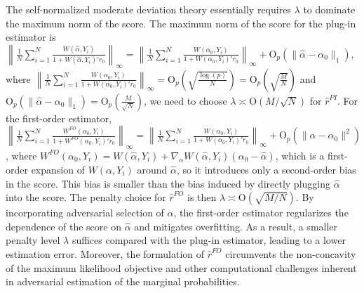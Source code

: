 \documentclass[11pt]{article}
\begin{document}
The self-normalized moderate deviation theory essentially requires $\lambda$ to dominate the maximum norm of the score. The maximum norm of the score for the plug-in estimator is $\left\|\frac{1}{N}\sum_{i=1}^N\frac{W(\hat{\alpha},Y_i)}{1+W(\hat\alpha,Y_i)'r_0}\right\|_\infty=\left\|\frac{1}{N}\sum_{i=1}^N\frac{W(\alpha_0,Y_i)}{1+W(\alpha_0,Y_i)'r_0}\right\|_\infty+\mathrm{O}_p(\|\hat{\alpha}-\alpha_0\|_1)$, where $\left\|\frac{1}{N}\sum_{i=1}^N\frac{W(\alpha_0,Y_i)}{1+W(\alpha_0,Y_i)'r_0}\right\|_\infty=\mathrm{O}_p(\sqrt{\frac{\log(p)}{N}})=\mathrm{O}_p(\sqrt{\frac{M}{N}})$ and $\mathrm{O}_p(\|\hat{\alpha}-\alpha_0\|_1)=\mathrm{O}_p(\frac{M}{\sqrt{N}})$, we need to choose $\lambda\asymp\mathrm{O}(M/\sqrt{N})$ for $\hat{r}^{PI}$. For the first-order estimator, $\left\|\frac{1}{N}\sum_{i=1}^N\frac{W^{FO}(\alpha_0,Y_i)}{1+W^{FO}(\alpha_0,Y_i)'r_0}\right\|_\infty=\left\|\frac{1}{N}\sum_{i=1}^N\frac{W(\alpha_0,Y_i)}{1+W(\alpha_0,Y_i)'r_0}\right\|_\infty+\mathrm{O}_p(\|\hat{\alpha}-\alpha_0\|^2)$, where $W^{FO}(\alpha_0,Y_i)=W(\hat\alpha,Y_i)+\nabla_{\alpha} W(\hat\alpha,Y_i)(\alpha_0-\hat\alpha)$, which is a first-order expansion of $W(\alpha,Y_i)$ around $\hat{\alpha}$, so it introduces only a second-order bias in the score. This bias is smaller than the bias induced by directly plugging $\hat{\alpha}$ into the score. The penalty choice for $\hat{r}^{FO}$ is then $\lambda\asymp\mathrm{O}(\sqrt{M/N})$. By incorporating adversarial selection of $\alpha$, the first-order estimator regularizes the dependence of the score on $\hat{\alpha}$ and mitigates overfitting. As a result, a smaller penalty level $\lambda$ suffices compared with the plug-in estimator, leading to a lower estimation error. Moreover, the formulation of $\hat{r}^{FO}$ circumvents the non-concavity of the maximum likelihood objective and other computational challenges inherent in adversarial estimation of the marginal probabilities. 
\end{document}
